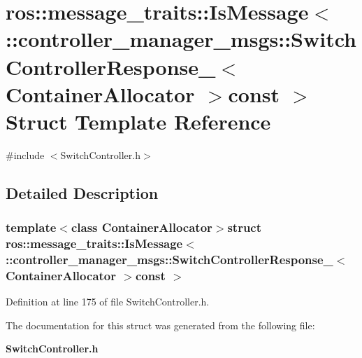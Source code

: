 \section{ros\-:\-:message\-\_\-traits\-:\-:\-Is\-Message$<$ \-:\-:controller\-\_\-manager\-\_\-msgs\-:\-:\-Switch\-Controller\-Response\-\_\-$<$ \-Container\-Allocator $>$const $>$ \-Struct \-Template \-Reference}
\label{structros_1_1message__traits_1_1IsMessage_3_01_1_1controller__manager__msgs_1_1SwitchControllerR5bf21e01aef818ea5ab519156c48d7d4}


{\ttfamily \#include $<$\-Switch\-Controller.\-h$>$}



\subsection{\-Detailed \-Description}
\subsubsection*{template$<$class Container\-Allocator$>$struct ros\-::message\-\_\-traits\-::\-Is\-Message$<$ \-::controller\-\_\-manager\-\_\-msgs\-::\-Switch\-Controller\-Response\-\_\-$<$ Container\-Allocator $>$const  $>$}



\-Definition at line 175 of file \-Switch\-Controller.\-h.



\-The documentation for this struct was generated from the following file\-:\begin{DoxyCompactItemize}
\item 
{\bf \-Switch\-Controller.\-h}\end{DoxyCompactItemize}
